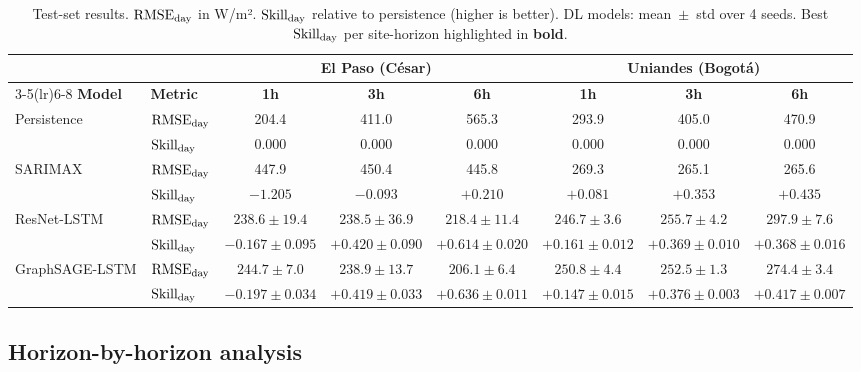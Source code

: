 \begin{table}[t]
  \centering
  \caption{Test-set results. $\text{RMSE}_\text{day}$ in W/m². $\text{Skill}_\text{day}$ relative to persistence
           (higher is better). DL models: mean~$\pm$~std over 4 seeds.
           Best $\text{Skill}_\text{day}$ per site-horizon highlighted in \textbf{bold}.}
  \label{tab:main}
  \setlength{\tabcolsep}{5pt}
  \begin{tabular}{llcccccc}
    \toprule
    & & \multicolumn{3}{c}{\textbf{El Paso (César)}} &
         \multicolumn{3}{c}{\textbf{Uniandes (Bogotá)}} \\
    \cmidrule(lr){3-5}\cmidrule(lr){6-8}
    \textbf{Model} & \textbf{Metric} & \textbf{1h} & \textbf{3h} & \textbf{6h}
                                     & \textbf{1h} & \textbf{3h} & \textbf{6h} \\
    \midrule
    \multirow{2}{*}{Persistence}
      & $\text{RMSE}_\text{day}$ & 204.4 & 411.0 & 565.3  & 293.9 & 405.0 & 470.9 \\
      & $\text{Skill}_\text{day}$ & 0.000 & 0.000 & 0.000 & 0.000 & 0.000 & 0.000 \\
    \midrule
    \multirow{2}{*}{SARIMAX}
      & $\text{RMSE}_\text{day}$ & 447.9 & 450.4 & 445.8 & 269.3 & 265.1 & 265.6 \\
      & $\text{Skill}_\text{day}$ & $-1.205$ & $-0.093$ & $+0.210$ & $+0.081$ & $+0.353$ & $+0.435$ \\
    \midrule
    \multirow{2}{*}{ResNet-LSTM}
      & $\text{RMSE}_\text{day}$ & $238.6 \pm 19.4$ & $238.5 \pm 36.9$ & $218.4 \pm 11.4$
                   & $246.7 \pm 3.6$ & $255.7 \pm 4.2$ & $297.9 \pm 7.6$ \\
      & $\text{Skill}_\text{day}$ & $-0.167 \pm 0.095$ & $+0.420 \pm 0.090$ & $\mathbf{+0.614} \pm 0.020$
                    & $+0.161 \pm 0.012$ & $+0.369 \pm 0.010$ & $+0.368 \pm 0.016$ \\
    \midrule
    \multirow{2}{*}{GraphSAGE-LSTM}
      & $\text{RMSE}_\text{day}$ & $244.7 \pm 7.0$ & $238.9 \pm 13.7$ & $\mathbf{206.1} \pm 6.4$
                   & $250.8 \pm 4.4$ & $252.5 \pm 1.3$ & $274.4 \pm 3.4$ \\
      & $\text{Skill}_\text{day}$ & $-0.197 \pm 0.034$ & $+0.419 \pm 0.033$ & $\mathbf{+0.636} \pm 0.011$
                    & $+0.147 \pm 0.015$ & $\mathbf{+0.376} \pm 0.003$ & $+0.417 \pm 0.007$ \\
    \bottomrule
  \end{tabular}
\end{table}

\subsection{Horizon-by-horizon analysis}


